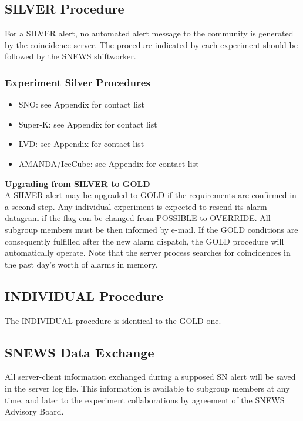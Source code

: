 \documentclass{article}
\begin{document}
\subsection{SILVER Procedure}\label{SILVER}
For a SILVER alert, no automated alert message to the community
is generated by the coincidence server. 
The procedure indicated by each experiment should be followed by
the SNEWS shiftworker.\\

\subsubsection{Experiment Silver Procedures}

\begin{itemize}

\item SNO: see Appendix for contact list
\item Super-K: see Appendix for contact list
\item LVD: see Appendix for contact list
\item AMANDA/IceCube: see Appendix for contact list

\end{itemize}


\noindent \textbf{Upgrading from SILVER to GOLD}\\
A SILVER alert may be upgraded to GOLD if the requirements are
confirmed in a second step. Any individual experiment is expected to
resend its alarm datagram if the flag can be changed from POSSIBLE to
OVERRIDE. All subgroup members must be then informed by
e-mail. If the GOLD conditions are consequently fulfilled after the
new alarm dispatch, the GOLD procedure will automatically operate.
Note that the server process searches for coincidences
in the past day's worth of alarms in memory.

\subsection{INDIVIDUAL Procedure}\label{INDIVIDUAL}

The INDIVIDUAL procedure is identical to the GOLD one.

\subsection{SNEWS Data Exchange}

All server-client information
exchanged during a supposed SN alert will be saved
in the server log file. This information is available to subgroup
members at any time, and later to the experiment collaborations
by agreement of the SNEWS Advisory Board.
\end{document}
